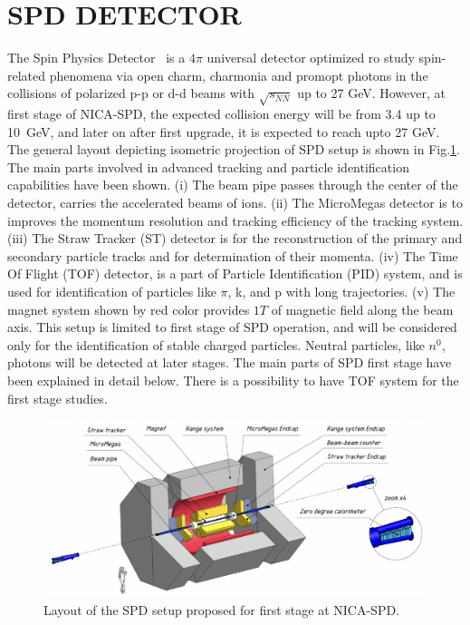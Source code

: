 \documentclass[12pt]{article}
\begin{document}
\section{SPD DETECTOR}
\label{SPD DETECTOR}
The Spin Physics Detector~\cite{SPDproto:2021hnm,TDR} is a $4\pi$ universal detector optimized
ro study spin-related phenomena via open charm, charmonia and promopt photons in the
collisions of polarized p-p or d-d beams with $\sqrt{s_{NN}}$ up to 27 GeV.
However, at first stage of NICA-SPD, the expected collision energy will be from 3.4 up to 10~GeV, and later on after first upgrade, it is expected to reach upto 27 GeV. The general layout depicting isometric projection of SPD setup is shown in Fig.\ref{Layout of the SPD setup proposed for first stage at NICA-SPD.}. The main parts involved in advanced tracking and particle identification capabilities have been shown. (i) The beam pipe passes through the center of the detector, carries the accelerated beams of ions. (ii) The MicroMegas detector is to improves the momentum resolution and tracking efficiency of the tracking system. (iii) The Straw Tracker (ST) detector is for the reconstruction of the primary and secondary particle tracks and for determination of their momenta. (iv) The Time Of Flight (TOF) detector, is a part of Particle Identification (PID) system, and is used for identification of particles like $\pi$, k, and p with long trajectories. (v) The magnet system shown by red color provides $1T$ of magnetic field along the beam axis. This setup is limited to first stage of SPD operation, and will be considered only for the identification of stable charged particles. Neutral particles, like $n^{0}$, photons will be detected at later stages. The main parts of SPD first stage have been explained in detail below. There is a possibility to have TOF system for the first stage studies.

\begin{figure}[h]
\centering
\includegraphics[width=\textwidth]{Layout of the SPD setup proposed for first stage at NICA-SPD.png}
\caption{Layout of the SPD setup proposed for first stage at NICA-SPD.}
\label{Layout of the SPD setup proposed for first stage at NICA-SPD.}
\end{figure}
\end{document}
